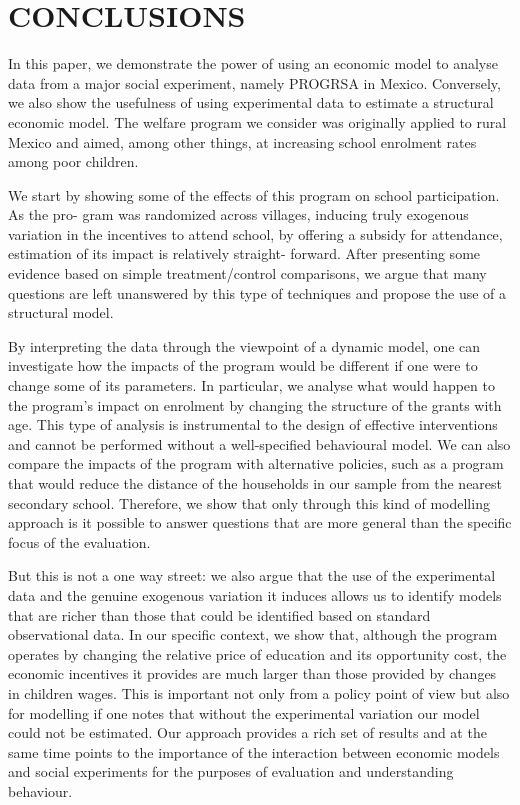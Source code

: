 \documentclass{handoutForSolutions}
\begin{document}
\newpage

\section{CONCLUSIONS}
In this paper, we demonstrate the power of using an economic model to analyse data from a major social experiment, namely PROGRSA in Mexico. Conversely, we also show the usefulness of using experimental data to estimate a structural economic model. The welfare program we consider was originally applied to rural Mexico and aimed, among other things, at increasing school enrolment rates among poor children.

We start by showing some of the effects of this program on school participation. As the pro- gram was randomized across villages, inducing truly exogenous variation in the incentives to attend school, by offering a subsidy for attendance, estimation of its impact is relatively straight- forward. After presenting some evidence based on simple treatment/control comparisons, we argue that many questions are left unanswered by this type of techniques and propose the use of a structural model.

By interpreting the data through the viewpoint of a dynamic model, one can investigate how the impacts of the program would be different if one were to change some of its parameters. In particular, we analyse what would happen to the program's impact on enrolment by changing the structure of the grants with age. This type of analysis is instrumental to the design of effective interventions and cannot be performed without a well-specified behavioural model. We can also compare the impacts of the program with alternative policies, such as a program that would reduce the distance of the households in our sample from the nearest secondary school. Therefore, we show that only through this kind of modelling approach is it possible to answer questions that are more general than the specific focus of the evaluation.

But this is not a one way street: we also argue that the use of the experimental data and the genuine exogenous variation it induces allows us to identify models that are richer than those that could be identified based on standard observational data. In our specific context, we show that, although the program operates by changing the relative price of education and its opportunity cost, the economic incentives it provides are much larger than those provided by changes in children wages. This is important not only from a policy point of view but also for modelling if one notes that without the experimental variation our model could not be estimated. Our approach provides a rich set of results and at the same time points to the importance of the interaction between economic models and social experiments for the purposes of evaluation and understanding behaviour.
\end{document}
